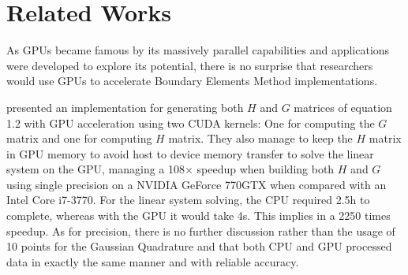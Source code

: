 \chapter{Related Works}

As GPUs became famous by its massively parallel capabilities and 
applications were developed to explore its potential, there is no 
surprise that researchers would use GPUs to accelerate
Boundary Elements Method implementations. 

\cite{torky:2017} presented an implementation for generating 
both $H$ and $G$ matrices of equation 1.2 with GPU acceleration 
using two CUDA kernels: One for computing the $G$ matrix and one 
for computing $H$ matrix. They also manage to keep the $H$ matrix 
in GPU memory to avoid host to device memory transfer to solve 
the linear system on the GPU, managing a 
108$\times$ speedup when building both $H$ and $G$ using single 
precision on a NVIDIA GeForce 770GTX when compared with an 
Intel Core i7-3770. For the linear system solving, the CPU required 
2.5h to complete, whereas with the GPU it would take 4s. This implies 
in a 2250 times speedup. As for precision, there is no further discussion 
rather than the usage of 10 points for the Gaussian Quadrature and that both 
CPU and GPU processed data in exactly the same manner and with reliable 
accuracy. 
